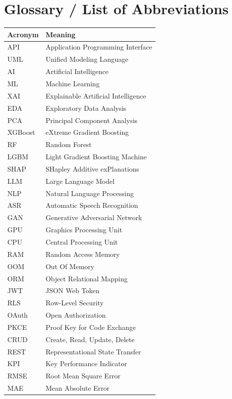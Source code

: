 \chapter*{Glossary / List of Abbreviations}
{}

\begin{longtable}{|p{4cm}|p{10cm}|}
\hline
\textbf{Acronym} & \textbf{Meaning} \\
\hline
API & Application Programming Interface \\
UML & Unified Modeling Language \\
AI & Artificial Intelligence \\
ML & Machine Learning \\
XAI & Explainable Artificial Intelligence \\
EDA & Exploratory Data Analysis \\
PCA & Principal Component Analysis \\
XGBoost & eXtreme Gradient Boosting \\
RF & Random Forest \\
LGBM & Light Gradient Boosting Machine \\
SHAP & SHapley Additive exPlanations \\
LLM & Large Language Model \\
NLP & Natural Language Processing \\
ASR & Automatic Speech Recognition \\
GAN & Generative Adversarial Network \\
GPU & Graphics Processing Unit \\
CPU & Central Processing Unit \\
RAM & Random Access Memory \\
OOM & Out Of Memory \\
ORM & Object Relational Mapping \\
JWT & JSON Web Token \\
RLS & Row-Level Security \\
OAuth & Open Authorization \\
PKCE & Proof Key for Code Exchange \\
CRUD & Create, Read, Update, Delete \\
REST & Representational State Transfer \\
KPI & Key Performance Indicator \\
RMSE & Root Mean Square Error \\
MAE & Mean Absolute Error \\

\end{longtable}
